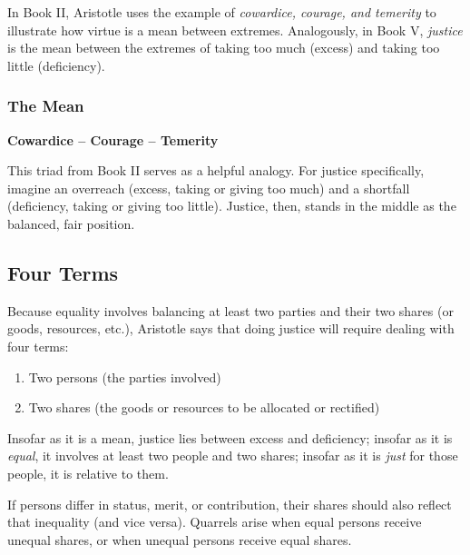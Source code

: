                     In Book II, Aristotle uses the example of \textit{cowardice, courage, and temerity} to illustrate how virtue is a mean between extremes. Analogously, in Book V, \textit{justice} is the mean between the extremes of taking too much (excess) and taking too little (deficiency).

                \subsubsection{The Mean}

                    \begin{center}
                        \textbf{Cowardice -- Courage -- Temerity}
                    \end{center}
                    
                    This triad from Book II serves as a helpful analogy. For justice specifically, imagine an overreach (excess, taking or giving too much) and a shortfall (deficiency, taking or giving too little). Justice, then, stands in the middle as the balanced, fair position.

            \subsection{Four Terms}

                Because equality involves balancing at least two parties and their two shares (or goods, resources, etc.), Aristotle says that doing justice will require dealing with four terms:
                \begin{enumerate}
                  \item Two persons (the parties involved)
                  \item Two shares (the goods or resources to be allocated or rectified)
                \end{enumerate}

                Insofar as it is a mean, justice lies between excess and deficiency; insofar as it is \textit{equal}, it involves at least two people and two shares; insofar as it is \textit{just} for those people, it is relative to them.

                \begin{remark}
                    If persons differ in status, merit, or contribution, their shares should also reflect that inequality (and vice versa). Quarrels arise when equal persons receive unequal shares, or when unequal persons receive equal shares.
                \end{remark}

